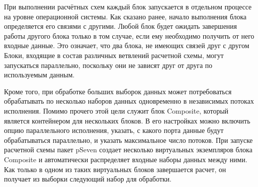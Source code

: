 При выполнении расчётных схем каждый блок запускается в отдельном процессе на уровне операционной системы. Как сказано ранее, начало выполнения блока определяется его связями с другими. Любой блок будет ожидать завершения работы другого блока только в том случае, если ему необходимо получить от него входные данные. Это означает, что два блока, не имеющих связей друг с другом Блоки, входящие в состав различных ветвлений расчетной схемы, могут запускаться параллельно, поскольку они не зависят друг от друга по используемым данным\cite{pSevenDocsWorkflow2021}.

Кроме того, при обработке больших выборок данных может потребоваться обрабатывать по несколько наборов данных одновременно в независимых потоках исполнения. Помимо прочего этой цели служит блок \textsf{Composite}, который является контейнером для нескольких блоков. В его настройках можно включить опцию параллельного исполнения, указать, с какого порта данные будут обрабатываться параллельно, и указать максимальное число потоков. При запуске расчетной схемы пакет \textsf{pSeven} создает несколько виртуальных экземпляров блока \textsf{Composite} и автоматически распределяет входные наборы данных между ними. Как только в одном из таких виртуальных блоков завершается расчет, он получает из выборки следующий набор для обработки.\cite{pSevenDocsParallel2021}

\noteattributes{}
